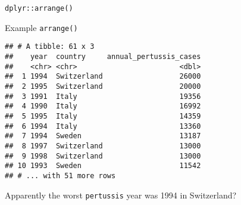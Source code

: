 \documentclass[ignorenonframetext,]{beamer}
\begin{document}
\begin{frame}[fragile]{\texttt{dplyr::arrange()}}
\begin{block}{Example \texttt{arrange()}}
\begin{verbatim}
## # A tibble: 61 x 3
##    year  country     annual_pertussis_cases
##    <chr> <chr>                        <dbl>
##  1 1994  Switzerland                  26000
##  2 1995  Switzerland                  20000
##  3 1991  Italy                        19356
##  4 1990  Italy                        16992
##  5 1995  Italy                        14359
##  6 1994  Italy                        13360
##  7 1994  Sweden                       13187
##  8 1997  Switzerland                  13000
##  9 1998  Switzerland                  13000
## 10 1993  Sweden                       11542
## # ... with 51 more rows
\end{verbatim}

Apparently the worst \texttt{pertussis} year was 1994 in Switzerland?

\end{block}

\end{frame}
\end{document}
